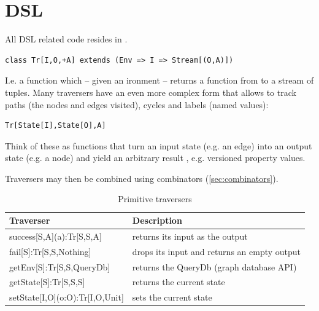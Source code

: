 \section{DSL}\label{sec:dsl}
All DSL related code resides in .

\begin{lstlisting}
class Tr[I,O,+A] extends (Env => I => Stream[(O,A)])
\end{lstlisting}
I.e. a function which -- given an ironment -- returns a function from  to a stream of  tuples. Many traversers have an even more complex form that allows to track paths (the nodes and edges visited), cycles and labels (named values):
\begin{lstlisting}
Tr[State[I],State[O],A]
\end{lstlisting}

Think of these as functions that turn an input state  (e.g. an edge) into an output state  (e.g. a node) and yield an arbitrary result , e.g. versioned property values.

Traversers may then be combined using combinators (\cref{sec:combinators}).

\begin{table}[hp]
\begin{tabularx}{\textwidth}{>{\ttfamily}lX}
\toprule
Traverser & Description\\
\midrule
success[S,A](a):Tr[S,S,A] & returns its input as the output \\
fail[S]:Tr[S,S,Nothing] & drops its input and returns an empty output \\
getEnv[S]:Tr[S,S,QueryDb] & returns the QueryDb (graph database API) \\
getState[S]:Tr[S,S,S] & returns the current state \\
setState[I,O](o:O):Tr[I,O,Unit] & sets the current state\\
\bottomrule
\end{tabularx}
\caption{Primitive traversers}\label{tab:primitives}
\end{table}


